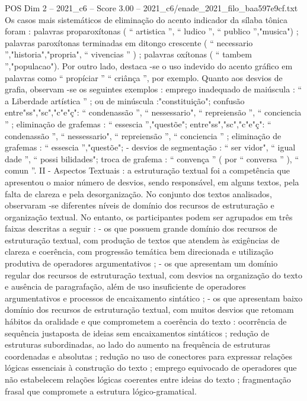\begin{textsample}{POS Dim 2 – 2021\_c6 – Score 3.00 – 2021\_c6/enade\_2021\_filo\_baa597e9cf.txt}
Os casos mais sistemáticos de eliminação do acento indicador da sílaba tônica foram : palavras proparoxítonas ( “ artistica ”, “ ludico ”, “ publico ”,"musica") ; palavras paroxítonas terminadas em ditongo crescente ( “ necessario ”,"historia","propria", “ vivencias ” ) ; palavras oxítonas ( “ tambem ”,"populacao").
Por outro lado, destaca -se o uso indevido do acento gráfico em palavras como “ propíciar ” “ criânça ”, por exemplo.
Quanto aos desvios de grafia, observam -se os seguintes exemplos : emprego inadequado de maiúscula : “ a Liberdade artística ” ; ou de minúscula :"constituição"; confusão entre"ss","sc","c"e"ç": “ condenassão ”, “ nessessario", “ repreiensão ”, “ conciencia ” ; eliminação de grafemas : “ essescia ”,"questõe"; entre"ss","sc","c"e"ç": “ condenassão ”, “ nessessario", “ repreiensão ”, “ conciencia ” ; eliminação de grafemas : “ essescia ”,"questõe"; - desvios de segmentação : “ ser vidor", “ igual dade ”, “ possi bilidades"; troca de grafema : “ convença ” ( por “ conversa ” ), “ comun ”.
II - Aspectos Textuais : a estruturação textual foi a competência que apresentou o maior número de desvios, sendo responsável, em alguns textos, pela falta de clareza e pela desorganização.
No conjunto dos textos analisados, observaram -se diferentes níveis de domínio dos recursos de estruturação e organização textual.
No entanto, os participantes podem ser agrupados em três faixas descritas a seguir : - os que possuem grande domínio dos recursos de estruturação textual, com produção de textos que atendem às exigências de clareza e coerência, com progressão temática bem direcionada e utilização produtiva de operadores argumentativos ; - os que apresentam um domínio regular dos recursos de estruturação textual, com desvios na organização do texto e ausência de paragrafação, além de uso insuficiente de operadores argumentativos e processos de encaixamento sintático ; - os que apresentam baixo domínio dos recursos de estruturação textual, com muitos desvios que retomam hábitos da oralidade e que comprometem a coerência do texto : ocorrência de sequência justaposta de ideias sem encaixamentos sintáticos ; redução de estruturas subordinadas, ao lado do aumento na frequência de estruturas coordenadas e absolutas ; redução no uso de conectores para expressar relações lógicas essenciais à construção do texto ; emprego equivocado de operadores que não estabelecem relações lógicas coerentes entre ideias do texto ; fragmentação frasal que compromete a estrutura lógico-gramatical.

\end{textsample}

